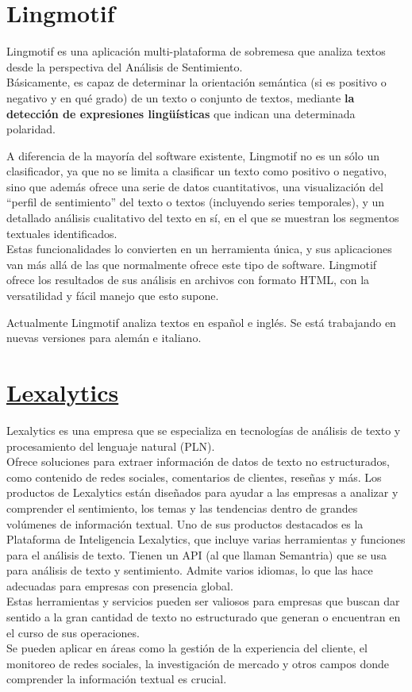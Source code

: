 
\section{Lingmotif~\cite{lingmotif}}
Lingmotif es una aplicación multi-plataforma de sobremesa que analiza textos desde la perspectiva 
del Análisis de Sentimiento. \\Básicamente, es capaz de determinar la orientación semántica 
(si es positivo o negativo y en qué grado) de un texto o conjunto de textos, mediante \textbf{la detección 
de expresiones lingüísticas} que indican una determinada polaridad.

A diferencia de la mayoría del software existente, Lingmotif no es un sólo un clasificador, 
ya que no se limita a clasificar un texto como positivo o negativo, sino que además ofrece una 
serie de datos cuantitativos, una visualización del ``perfil de sentimiento'' del texto o textos 
(incluyendo series temporales), y un detallado análisis cualitativo del texto en sí, en el que 
se muestran los segmentos textuales identificados. \\Estas funcionalidades lo convierten en un herramienta 
única, y sus aplicaciones van más allá de las que normalmente ofrece este tipo de software. 
Lingmotif ofrece los resultados de sus análisis en archivos con formato HTML, con la versatilidad y 
fácil manejo que esto supone.

Actualmente Lingmotif analiza textos en español e inglés. Se está trabajando en nuevas versiones 
para alemán e italiano.

\section{\href{https://www.lexalytics.com/}{Lexalytics}}
Lexalytics es una empresa que se especializa en tecnologías de análisis de texto y 
procesamiento del lenguaje natural (PLN).\\
Ofrece soluciones para extraer información de datos de texto no estructurados, 
como contenido de redes sociales, comentarios de clientes, reseñas y más. 
Los productos de Lexalytics están diseñados para ayudar a las empresas a analizar 
y comprender el sentimiento, los temas y las tendencias dentro de grandes volúmenes de información textual.
Uno de sus productos destacados es la Plataforma de Inteligencia Lexalytics, 
que incluye varias herramientas y funciones para el análisis de texto. 
Tienen un API (al que llaman Semantria) que se usa para análisis de texto y sentimiento.
Admite varios idiomas, lo que las hace adecuadas para empresas con presencia global.\\
Estas herramientas y servicios pueden ser valiosos para empresas que 
buscan dar sentido a la gran cantidad de texto no estructurado que generan o 
encuentran en el curso de sus operaciones. \\Se pueden aplicar en áreas como la gestión 
de la experiencia del cliente, el monitoreo de redes sociales, la investigación de mercado 
y otros campos donde comprender la información textual es crucial. 

